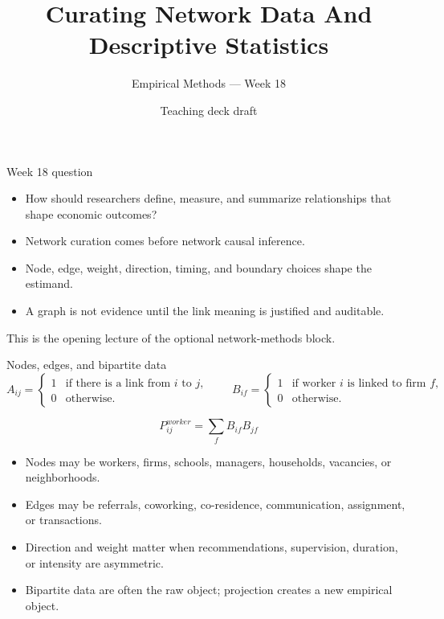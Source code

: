 \documentclass[aspectratio=169,11pt]{beamer}
\title{Curating Network Data And Descriptive Statistics}
\subtitle{Empirical Methods --- Week 18}
\author{Teaching deck draft}
\date{}
\newcommand{\1}{\mathbf{1}}
\begin{document}
\begin{frame}
  \titlepage
\end{frame}

\begin{frame}{Week 18 question}
\begin{itemize}
    \item How should researchers define, measure, and summarize relationships that shape economic outcomes?
    \item Network curation comes before network causal inference.
    \item Node, edge, weight, direction, timing, and boundary choices shape the estimand.
    \item A graph is not evidence until the link meaning is justified and auditable.
\end{itemize}

\medskip
This is the opening lecture of the optional network-methods block.
\end{frame}

\begin{frame}{Nodes, edges, and bipartite data}
\small
\[
A_{ij}=
\begin{cases}
1 & \text{if there is a link from } i \text{ to } j,\\
0 & \text{otherwise.}
\end{cases}
\qquad
B_{if}=
\begin{cases}
1 & \text{if worker } i \text{ is linked to firm } f,\\
0 & \text{otherwise.}
\end{cases}
\]

\[
P^{worker}_{ij}=\sum_f B_{if}B_{jf}
\]

\begin{itemize}
    \item Nodes may be workers, firms, schools, managers, households, vacancies, or neighborhoods.
    \item Edges may be referrals, coworking, co-residence, communication, assignment, or transactions.
    \item Direction and weight matter when recommendations, supervision, duration, or intensity are asymmetric.
    \item Bipartite data are often the raw object; projection creates a new empirical object.
\end{itemize}
\end{frame}
\end{document}
